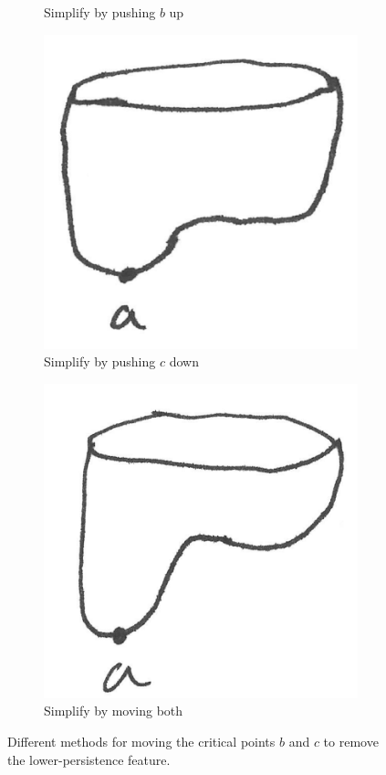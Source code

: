 \documentclass{article}
\begin{document}
\begin{figure}
\begin{subfigure}{0.24\columnwidth}
		\caption{Simplify by pushing $b$ up}
	\end{subfigure}
	\begin{subfigure}{0.24\columnwidth}
		\centering
		\includegraphics[width=\textwidth]{fig/blobby-torus-bottom-reduced2}
		\caption{Simplify by pushing $c$ down}
	\end{subfigure}
	\begin{subfigure}{0.24\columnwidth}
		\centering
		\includegraphics[width=\textwidth]{fig/blobby-torus-bottom-reduced3}
		\caption{Simplify by moving both}
	\end{subfigure}
	\caption{\label{fig:simplification} Different methods for moving the critical points $b$ and $c$
	to remove the lower-persistence feature.}
\end{figure}
\end{document}
